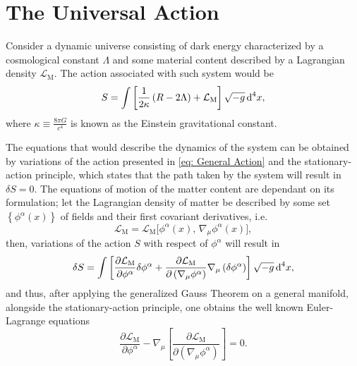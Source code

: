 \section{The Universal Action}
Consider a dynamic universe consisting of dark energy characterized by a cosmological constant $\Lambda$ and some material content described by a Lagrangian density $\mathcal{L}_{\text{M}}$. The action associated with such system would be
\begin{equation}\label{eq: General Action}
	S=\int\left[\frac{1}{2\kappa}\left(R-2\Lambda\right)+\mathcal{L}_{\text{M}}\right]\sqrt{-g}\,\text{d}^4 x,
\end{equation}
where $\kappa\equiv\frac{8\pi G}{c^4}$ is known as the Einstein gravitational constant.

The equations that would describe the dynamics of the system can be obtained by variations of the action presented in \cref{eq: General Action} and the stationary-action principle, which states that the path taken by the system will result in $\delta S=0$. The equations of motion of the matter content are dependant on its formulation; let the Lagrangian density of matter be described by some set $\left\{\phi^\alpha(x)\right\}$ of fields and their first covariant derivatives, i.e.
\begin{equation}
	\mathcal{L}_{\text{M}}=\mathcal{L}_{\text{M}}\big[\phi^\alpha(x),\,\nabla_\mu\phi^\alpha(x)\big],
\end{equation}
then, variations of the action $S$ with respect of $\phi^\alpha$ will result in
\begin{equation}
	\delta S=\int\left[\frac{\partial \mathcal{L}_\text{M}}{\partial \phi^\alpha}\delta\phi^\alpha+\frac{\partial \mathcal{L}_\text{M}}{\partial\left(\nabla_\mu\phi^\alpha\right)}\nabla_\mu\left(\delta\phi^\alpha\right)\right]\sqrt{-g}\,\text{d}^4x,
\end{equation}
and thus, after applying the generalized Gauss Theorem on a general manifold, alongside the stationary-action principle, one obtains the well known Euler-Lagrange equations
\begin{equation}\label{eq: Euler-Lagrange}
	\frac{\partial\mathcal{L}_{\text{M}}}{\partial\phi^\alpha}-\nabla_\mu\left[\frac{\partial \mathcal{L}_{\text{M}}}{\partial\left(\nabla_\mu\phi^\alpha\right)}\right]=0.
\end{equation}

